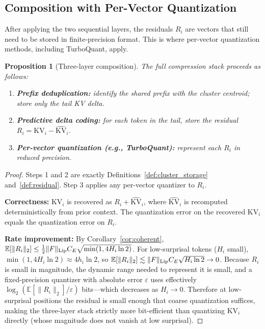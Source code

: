 \documentclass[11pt]{article}
\newtheorem{proposition}{Proposition}
\begin{document}
\subsection{Composition with Per-Vector Quantization}

After applying the two sequential layers, the residuals $R_i$ are vectors that
still need to be stored in finite-precision format.  This is where per-vector
quantization methods, including TurboQuant, apply.

\begin{proposition}[Three-layer composition]
\label{prop:three_layer}
The full compression stack proceeds as follows:
\begin{enumerate}[leftmargin=2em]
  \item \textbf{Prefix deduplication:} identify the shared prefix with the
        cluster centroid; store only the tail KV delta.
  \item \textbf{Predictive delta coding:} for each token in the tail, store
        the residual $R_i = \mathrm{KV}_i - \widehat{\mathrm{KV}}_i$.
  \item \textbf{Per-vector quantization (e.g., TurboQuant):} represent each
        $R_i$ in reduced precision.
\end{enumerate}
\end{proposition}

\begin{proof}
Steps 1 and 2 are exactly Definitions~\ref{def:cluster_storage}
and~\ref{def:residual}.  Step 3 applies any per-vector quantizer to $R_i$.

\textbf{Correctness:} $\mathrm{KV}_i$ is recovered as $R_i + \widehat{\mathrm{KV}}_i$,
where $\widehat{\mathrm{KV}}_i$ is recomputed deterministically from prior context.
The quantization error on the recovered $\mathrm{KV}_i$ equals the quantization
error on $R_i$.

\textbf{Rate improvement:} By Corollary~\ref{cor:coherent},
$\mathbb{E}[\|R_i\|_2] \leq \tfrac{1}{2}\|F\|_{\rm Lip} C_E \sqrt{\min(1,4H_i\ln 2)}$.
For low-surprisal tokens ($H_i$ small), $\min(1,4H_i\ln 2) \approx 4h_i\ln 2$,
so $\mathbb{E}[\|R_i\|_2] \lesssim \|F\|_{\rm Lip} C_E \sqrt{H_i\ln 2} \to 0$.
Because $R_i$ is small in magnitude, the dynamic range needed to represent it
is small, and a fixed-precision quantizer with absolute error $\varepsilon$
uses effectively $\log_2(\mathbb{E}[\|R_i\|_2]/\varepsilon)$ bits---which
decreases as $H_i \to 0$.  Therefore at low-surprisal positions the residual
is small enough that coarse quantization suffices, making the three-layer stack
strictly more bit-efficient than quantizing $\mathrm{KV}_i$ directly (whose
magnitude does not vanish at low surprisal).
\end{proof}
\end{document}
